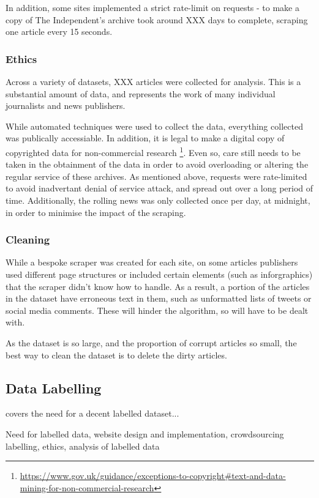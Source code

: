 In addition, some sites implemented a strict rate-limit on requests - to make a copy of The Independent's archive took around XXX days to complete, scraping one article every 15 seconds. 

\subsubsection{Ethics}
Across a variety of datasets, XXX articles were collected for analysis. This is a substantial amount of data, and represents the work of many individual journalists and news publishers. 

While automated techniques were used to collect the data, everything collected was publically accessiable. In addition, it is legal to make a digital copy of copyrighted data for non-commercial research \footnote{\url{https://www.gov.uk/guidance/exceptions-to-copyright#text-and-data-mining-for-non-commercial-research}}. Even so, care still needs to be taken in the obtainment of the data in order to avoid overloading or altering the regular service of these archives. As mentioned above, requests were rate-limited to avoid inadvertant denial of service attack, and spread out over a long period of time. Additionally, the rolling news was only collected once per day, at midnight, in order to minimise the impact of the scraping.

\subsubsection{Cleaning}
While a bespoke scraper was created for each site, on some articles publishers used different page structures or included certain elements (such as inforgraphics) that the scraper didn't know how to handle. As a result, a portion of the articles in the dataset have erroneous text in them, such as unformatted lists of tweets or social media comments. These will hinder the algorithm, so will have to be dealt with.

As the dataset is so large, and the proportion of corrupt articles so small, the best way to clean the dataset is to delete the dirty articles.




\subsection{Data Labelling}
 covers the need for a decent labelled dataset...

Need for labelled data, website design and implementation, crowdsourcing labelling, ethics, analysis of labelled data
